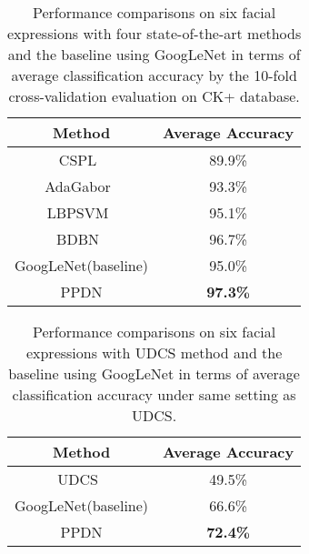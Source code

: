 \documentclass[runningheads]{llncs}
\begin{document}
\begin{table}[!tp]
	\begin{center}
		\caption{Performance comparisons on six facial expressions with four state-of-the-art methods and the baseline using GoogLeNet in terms of average classification accuracy by the 10-fold cross-validation evaluation on CK+ database.}
		\label{table:ckcom_image}
		\begin{tabular}{c|c}
			\hline\noalign{\smallskip}
			Method & Average Accuracy\\
			
			\hline
			
			CSPL~\cite{zhong2012learning}  & 89.9\% \\
			AdaGabor~\cite{bartlett2005recognizing}&  93.3\% \\
			LBPSVM~\cite{shan2009facial} &  95.1\%\\
			BDBN~\cite{liu2014facial}& 96.7\% \\
			GoogLeNet(baseline) & 95.0\% \\
			\hline
			PPDN& \textbf{97.3\%} \\
			\hline
		\end{tabular}
	\end{center}
\end{table}


\begin{table}[!tp]
	\begin{center}
		\caption{Performance comparisons on six facial expressions with UDCS method and the baseline using GoogLeNet in terms of average classification accuracy under same setting as UDCS.}
		\label{table:oulucom_image}
	
		\begin{tabular}{c|c}
		   
			\hline\noalign{\smallskip}
			Method & Average Accuracy\\			
			\hline			
            UDCS~\cite{UDCS} & 49.5\% \\
			GoogLeNet(baseline) & 66.6\% \\
			\hline
			PPDN& \textbf{72.4\%} \\
			\hline
		\end{tabular}
	\end{center}
\end{table}
\end{document}
